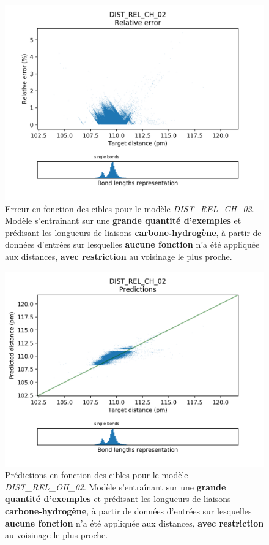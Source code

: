 \begin{figure}[!h]
	\centering
	
	\includegraphics[scale=0.75]{../figures/DIST_REL_CH_02/DIST_REL_CH_02_distrib_rmse_dist.png}	
	
	\caption{Erreur en fonction des cibles pour le modèle \emph{DIST\_REL\_CH\_02}. Modèle s'entraînant sur une \textbf{grande quantité d'exemples} et prédisant les longueurs de liaisons \textbf{carbone-hydrogène}, à partir de données d'entrées sur lesquelles \textbf{aucune fonction} n'a été appliquée aux distances, \textbf{avec restriction} au voisinage le plus proche.}
\end{figure}

\begin{figure}[!h]
	\centering
	
	\includegraphics[scale=0.75]{../figures/DIST_REL_CH_02/DIST_REL_CH_02_preds_targets.png}	
	
	\caption{Prédictions en fonction des cibles pour le modèle \emph{DIST\_REL\_OH\_02}. Modèle s'entraînant sur une \textbf{grande quantité d'exemples} et prédisant les longueurs de liaisons \textbf{carbone-hydrogène}, à partir de données d'entrées sur lesquelles \textbf{aucune fonction} n'a été appliquée aux distances, \textbf{avec restriction} au voisinage le plus proche.}
	
\end{figure}


